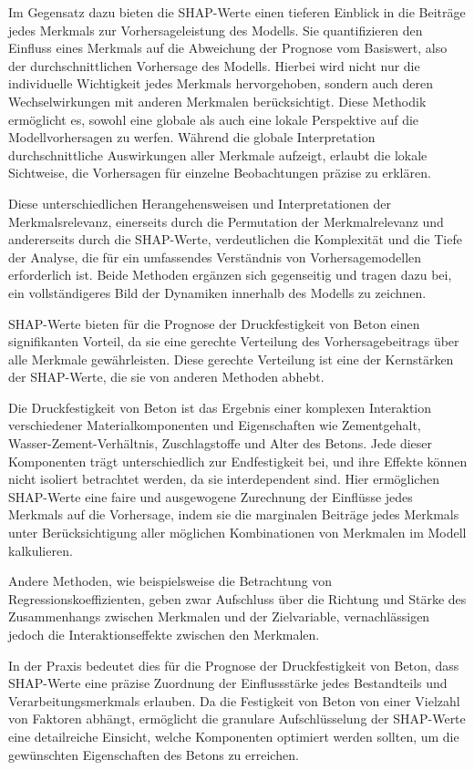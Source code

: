 Im Gegensatz dazu bieten die SHAP-Werte einen tieferen Einblick in die Beiträge jedes Merkmals zur Vorhersageleistung des Modells. 
Sie quantifizieren den Einfluss eines Merkmals auf die Abweichung der Prognose vom Basiswert, also der durchschnittlichen Vorhersage des Modells. 
Hierbei wird nicht nur die individuelle Wichtigkeit jedes Merkmals hervorgehoben, sondern auch deren Wechselwirkungen mit anderen 
Merkmalen berücksichtigt. Diese Methodik ermöglicht es, sowohl eine globale als auch eine lokale Perspektive auf die Modellvorhersagen zu werfen. 
Während die globale Interpretation durchschnittliche Auswirkungen aller Merkmale aufzeigt, erlaubt die lokale Sichtweise, die Vorhersagen 
für einzelne Beobachtungen präzise zu erklären.

Diese unterschiedlichen Herangehensweisen und Interpretationen der Merkmalsrelevanz, einerseits durch die 
Permutation der Merkmalrelevanz und andererseits durch die SHAP-Werte, verdeutlichen die Komplexität und die Tiefe der Analyse, 
die für ein umfassendes Verständnis von Vorhersagemodellen erforderlich ist. Beide Methoden ergänzen sich gegenseitig und tragen dazu bei, 
ein vollständigeres Bild der Dynamiken innerhalb des Modells zu zeichnen.

SHAP-Werte bieten für die Prognose der Druckfestigkeit von Beton einen signifikanten Vorteil, 
da sie eine gerechte Verteilung des Vorhersagebeitrags über alle Merkmale gewährleisten. 
Diese gerechte Verteilung ist eine der Kernstärken der 
SHAP-Werte, die sie von anderen Methoden abhebt.

Die Druckfestigkeit von Beton ist das Ergebnis einer komplexen Interaktion verschiedener 
Materialkomponenten und Eigenschaften wie Zementgehalt, Wasser-Zement-Verhältnis, 
Zuschlagstoffe und Alter des Betons. Jede dieser Komponenten trägt unterschiedlich 
zur Endfestigkeit bei, und ihre Effekte können nicht isoliert betrachtet werden, 
da sie interdependent sind. Hier ermöglichen SHAP-Werte eine faire und ausgewogene 
Zurechnung der Einflüsse jedes Merkmals auf die Vorhersage, indem sie die marginalen 
Beiträge jedes Merkmals unter Berücksichtigung aller möglichen Kombinationen von Merkmalen 
im Modell kalkulieren.

Andere Methoden, wie beispielsweise die Betrachtung von Regressionskoeffizienten, 
geben zwar Aufschluss über die Richtung und Stärke des Zusammenhangs zwischen Merkmalen 
und der Zielvariable, vernachlässigen jedoch die Interaktionseffekte zwischen den Merkmalen.

In der Praxis bedeutet dies für die Prognose der Druckfestigkeit von Beton, 
dass SHAP-Werte eine präzise Zuordnung der Einflussstärke jedes Bestandteils 
und Verarbeitungsmerkmals erlauben. Da die Festigkeit von Beton von einer Vielzahl von 
Faktoren abhängt, ermöglicht die granulare Aufschlüsselung der SHAP-Werte eine 
detailreiche Einsicht, welche Komponenten optimiert werden sollten, um die gewünschten 
Eigenschaften des Betons zu erreichen.

